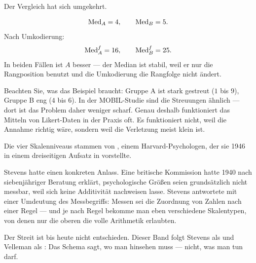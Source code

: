 \begin{aufgabe}
Der Vergleich hat sich umgekehrt. \checkmark

\[ \operatorname{Med}_A = 4, \qquad \operatorname{Med}_B = 5 . \]
Nach Umkodierung:
\[ \operatorname{Med}_A^f = 16, \qquad \operatorname{Med}_B^f = 25 . \]
In beiden Fällen ist $A$ besser --- der Median ist stabil, weil er nur die Rangposition benutzt und die Umkodierung die Rangfolge nicht ändert.

Beachten Sie, was das Beispiel braucht: Gruppe A ist stark gestreut ($1$ bis $9$), Gruppe B eng ($4$ bis $6$). In der MOBIL-Studie sind die Streuungen ähnlich --- dort ist das Problem daher weniger scharf. Genau deshalb funktioniert das Mitteln von Likert-Daten in der Praxis oft. Es funktioniert nicht, weil die Annahme richtig wäre, sondern weil die Verletzung meist klein ist.
\end{aufgabe}

\begin{geschichte}
Die vier Skalenniveaus stammen von , einem Harvard-Psychologen, der sie 1946 in einem dreiseitigen Aufsatz in  vorstellte.

Stevens hatte einen konkreten Anlass. Eine britische Kommission hatte 1940 nach siebenjähriger Beratung erklärt, psychologische Größen seien grundsätzlich nicht messbar, weil sich keine Additivität nachweisen lasse. Stevens antwortete mit einer Umdeutung des Messbegriffs: Messen sei die Zuordnung von Zahlen nach einer Regel --- und je nach Regel bekomme man eben verschiedene Skalentypen, von denen nur die oberen die volle Arithmetik erlaubten.

\begin{center}
\begin{minipage}{0.9\textwidth}
\end{minipage}
\end{center}

Der Streit ist bis heute nicht entschieden. Dieser Band folgt Stevens als  und Velleman als : Das Schema sagt, wo man hinsehen muss --- nicht, was man tun darf.
\end{geschichte}


